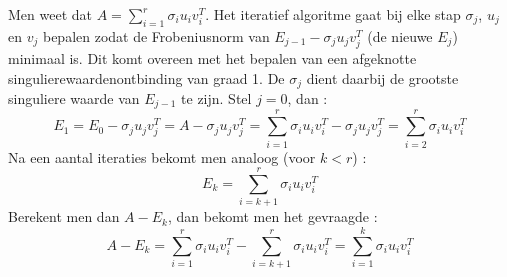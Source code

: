 

Men weet dat $A=\sum_{i=1}^r \sigma_iu_iv_i^T$. Het iteratief algoritme gaat bij elke stap $\sigma_j$, $u_j$ en $v_j$ bepalen zodat de Frobeniusnorm van $E_{j-1}-\sigma_ju_jv_j^T$ (de nieuwe $E_j$) minimaal is. Dit komt overeen met het bepalen van een afgeknotte singulierewaardenontbinding van graad 1. De $\sigma_j$ dient daarbij de grootste singuliere waarde van $E_{j-1}$ te zijn. Stel $j = 0$, dan :
$$E_1=E_0-\sigma_ju_jv_j^T=A-\sigma_ju_jv_j^T=\sum_{i=1}^r \sigma_iu_iv_i^T-\sigma_ju_jv_j^T = \sum_{i=2}^{r} \sigma_iu_iv_i^T$$
Na een aantal iteraties bekomt men analoog (voor $k<r$) :
$$E_k=\sum_{i=k+1}^{r} \sigma_iu_iv_i^T$$
Berekent men dan $A-E_k$, dan bekomt men het gevraagde :
$$A-E_k = \sum_{i=1}^{r} \sigma_iu_iv_i^T-\sum_{i=k+1}^{r} \sigma_iu_iv_i^T=\sum_{i=1}^{k} \sigma_iu_iv_i^T$$







